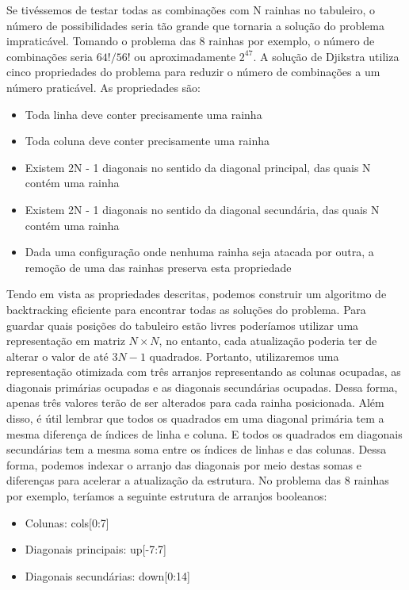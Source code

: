 \documentclass{article}
\begin{document}
Se tivéssemos de testar todas as combinações com N rainhas no tabuleiro, o número de possibilidades seria
tão grande que tornaria a solução do problema impraticável. Tomando o problema das 8 rainhas por exemplo,
o número de combinações seria $ 64!/56! $ ou aproximadamente $ 2^{47} $. A solução de Djikstra \cite{dijkstra1972} utiliza
cinco propriedades do problema para reduzir o número de combinações a um número praticável. 
As propriedades são:

\begin{itemize}
\item Toda linha deve conter precisamente uma rainha
\item Toda coluna deve conter precisamente uma rainha
\item Existem 2N - 1 diagonais no sentido da diagonal principal, das quais N contém uma rainha
\item Existem 2N - 1 diagonais no sentido da diagonal secundária, das quais N contém uma rainha
\item Dada uma configuração onde nenhuma rainha seja atacada por outra, a remoção de uma das rainhas preserva esta propriedade
\end{itemize}

Tendo em vista as propriedades descritas, podemos construir um algoritmo de backtracking eficiente para encontrar todas as
soluções do problema. Para guardar quais posições do tabuleiro estão livres poderíamos utilizar uma representação em matriz
$ N \times N $, no entanto, cada atualização poderia ter de alterar o valor de até $ 3N - 1 $ quadrados. Portanto, utilizaremos
uma representação otimizada com três arranjos representando as colunas ocupadas, as diagonais primárias ocupadas e as diagonais 
secundárias ocupadas. Dessa forma, apenas três valores terão de ser alterados para cada rainha posicionada. Além disso, é útil 
lembrar que todos os quadrados em uma diagonal primária tem a mesma diferença de índices de linha e coluna. E todos os quadrados 
em diagonais secundárias tem a mesma soma entre os índices de linhas e das colunas. Dessa forma, podemos indexar o 
arranjo das diagonais por meio destas somas e diferenças para acelerar a atualização da estrutura. No problema das 8 rainhas
por exemplo, teríamos a seguinte estrutura de arranjos booleanos:

\begin{itemize}
\item Colunas: cols[0:7]
\item Diagonais principais: up[-7:7]
\item Diagonais secundárias: down[0:14]
\end{itemize}
\end{document}
